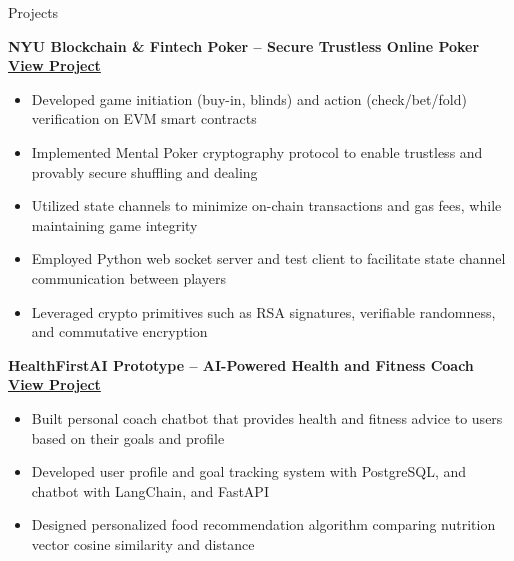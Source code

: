\documentclass{resume} %
\begin{document}
\begin{rSection}{Projects}

	\textbf{NYU Blockchain \& Fintech Poker – Secure Trustless Online Poker \href{https://github.com/nyublockchainfintech/poker_dapp_backend}{View Project}}
	\begin{itemize}
		\item Developed game initiation (buy-in, blinds) and action (check/bet/fold) verification on EVM smart contracts
		\item Implemented Mental Poker cryptography protocol to enable trustless and provably secure shuffling and dealing
		\item Utilized state channels to minimize on-chain transactions and gas fees, while maintaining game integrity
		\item Employed Python web socket server and test client to facilitate state channel communication between players
		\item Leveraged crypto primitives such as RSA signatures, verifiable randomness, and commutative encryption
	\end{itemize}

	\textbf{HealthFirstAI Prototype – AI-Powered Health and Fitness Coach \href{https://github.com/healthfirstai/prototype-backend}{View Project}}
	\begin{itemize}
		\item Built personal coach chatbot that provides health and fitness advice to users based on their goals and profile
		\item Developed user profile and goal tracking system with PostgreSQL, and chatbot with LangChain, and FastAPI
		\item Designed personalized food recommendation algorithm comparing nutrition vector cosine similarity and distance
	\end{itemize}

\end{rSection}

\end{document}
